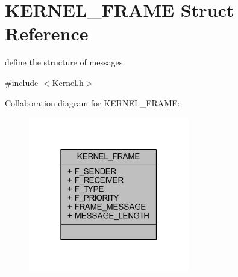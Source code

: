 \hypertarget{struct_k_e_r_n_e_l___f_r_a_m_e}{}\section{K\+E\+R\+N\+E\+L\+\_\+\+F\+R\+A\+ME Struct Reference}
\label{struct_k_e_r_n_e_l___f_r_a_m_e}


define the structure of messages.  




{\ttfamily \#include $<$Kernel.\+h$>$}



Collaboration diagram for K\+E\+R\+N\+E\+L\+\_\+\+F\+R\+A\+ME\+:
\nopagebreak
\begin{figure}[H]
\begin{center}
\leavevmode
\includegraphics[width=199pt]{struct_k_e_r_n_e_l___f_r_a_m_e__coll__graph}
\end{center}
\end{figure}
